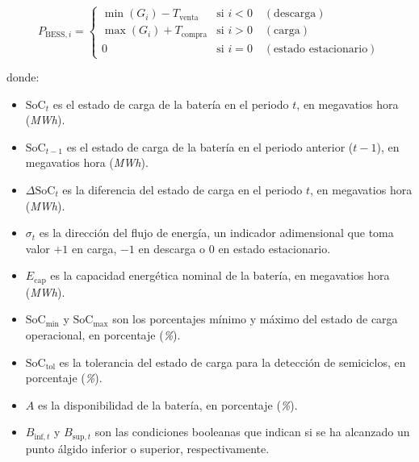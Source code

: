 \begin{equation}
  P_{\text{BESS}, i} =
  \begin{cases}
    \min(G_{i}) - T_{\text{venta}}  & \text{si } i < 0 \quad (\text{descarga})\\
    \max(G_{i}) + T_{\text{compra}} & \text{si } i > 0 \quad (\text{carga})\\
    0                               & \text{si } i = 0 \quad (\text{estado estacionario})
  \end{cases}
\end{equation}

donde:

\begin{itemize}

  \item \( \mathrm{SoC}_{t} \) es el estado de carga de la batería en el periodo \( t \), en megavatios hora (\textit{MWh}).

  \item \( \mathrm{SoC}_{t-1} \) es el estado de carga de la batería en el periodo anterior (\( t-1 \)), en megavatios hora (\textit{MWh}).

  \item \( \Delta \mathrm{SoC}_{t} \) es la diferencia del estado de carga en el periodo \( t \), en megavatios hora (\textit{MWh}).

  \item \( \sigma_{t} \) es la dirección del flujo de energía, un indicador adimensional que toma valor \(+1\) en carga, \(-1\) en descarga o \(0\) en estado estacionario.

  \item \( E_{\text{cap}} \) es la capacidad energética nominal de la batería, en megavatios hora (\textit{MWh}).

  \item \( \mathrm{SoC}_{\text{min}} \) y \( \mathrm{SoC}_{\text{max}} \) son los porcentajes mínimo y máximo del estado de carga operacional, en porcentaje (\textit{\%}).

  \item \( \mathrm{SoC}_{\text{tol}} \) es la tolerancia del estado de carga para la detección de semiciclos, en porcentaje (\textit{\%}).

  \item \( A \) es la disponibilidad de la batería, en porcentaje (\textit{\%}).

  \item \( B_{\text{inf}, t} \) y \( B_{\text{sup}, t} \) son las condiciones booleanas que indican si se ha alcanzado un punto álgido inferior o superior, respectivamente.


\end{itemize}
